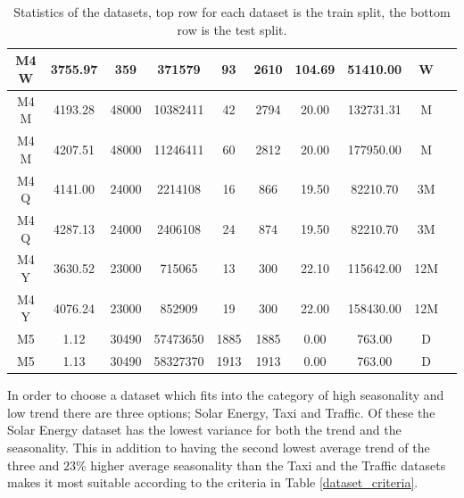 \begin{table}[htb]
\begin{tabular}{c | c c c c c c c c c}
    M4 W              & 3755.97        & 359              & 371579          & 93                 & 2610              & 104.69        & 51410.00      & W               \\
    \hline
    M4 M              & 4193.28        & 48000            & 10382411        & 42                 & 2794              & 20.00         & 132731.31     & M               \\
    M4 M              & 4207.51        & 48000            & 11246411        & 60                 & 2812              & 20.00         & 177950.00     & M               \\
    \hline
    M4 Q              & 4141.00        & 24000            & 2214108         & 16                 & 866               & 19.50         & 82210.70      & 3M              \\
    M4 Q              & 4287.13        & 24000            & 2406108         & 24                 & 874               & 19.50         & 82210.70      & 3M              \\
    \hline
    M4 Y              & 3630.52        & 23000            & 715065          & 13                 & 300               & 22.10         & 115642.00     & 12M             \\
    M4 Y              & 4076.24        & 23000            & 852909          & 19                 & 300               & 22.00         & 158430.00     & 12M             \\
    \hline
    M5                & 1.12           & 30490            & 57473650        & 1885               & 1885              & 0.00          & 763.00        & D               \\
    M5                & 1.13           & 30490            & 58327370        & 1913               & 1913              & 0.00          & 763.00        & D               \\
    \hline
  \end{tabular}
  \caption{Statistics of the datasets, top row for each dataset is the train split, the bottom row is the test split.}
  \label{tab:dataset_statistics}
\end{table}
\clearpage

In order to choose a dataset which fits into the category of high seasonality and low trend there are three options; Solar Energy, Taxi and Traffic. Of these the Solar Energy dataset has the lowest variance for both the trend and the seasonality. This in addition to having the second lowest average trend of the three and \(23\)\% higher average seasonality than the Taxi and the Traffic datasets makes it most suitable according to the criteria in Table \ref{dataset_criteria}.

